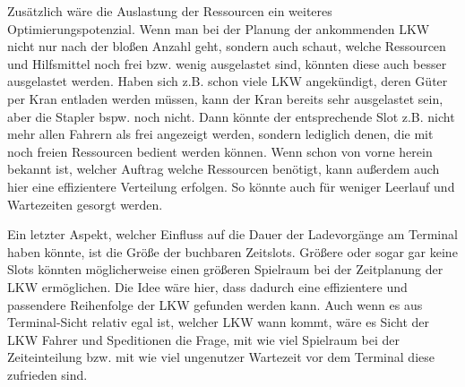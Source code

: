 Zusätzlich wäre die Auslastung der Ressourcen ein weiteres Optimierungspotenzial. Wenn man bei der Planung der ankommenden LKW nicht nur nach der bloßen Anzahl geht, sondern auch schaut, welche Ressourcen und Hilfsmittel noch frei bzw. wenig ausgelastet sind, könnten diese auch besser ausgelastet werden. Haben sich z.B. schon viele LKW angekündigt, deren Güter per Kran entladen werden müssen, kann der Kran bereits sehr ausgelastet sein, aber die Stapler bspw. noch nicht. Dann könnte der entsprechende Slot z.B. nicht mehr allen Fahrern als frei angezeigt werden, sondern lediglich denen, die mit noch freien Ressourcen bedient werden können. Wenn schon von vorne herein bekannt ist, welcher Auftrag welche Ressourcen benötigt, kann außerdem auch hier eine effizientere Verteilung erfolgen. So könnte auch für weniger Leerlauf und Wartezeiten gesorgt werden.

Ein letzter Aspekt, welcher Einfluss auf die Dauer der Ladevorgänge am Terminal haben könnte, ist die Größe der buchbaren Zeitslots. Größere oder sogar gar keine Slots könnten möglicherweise einen größeren Spielraum bei der Zeitplanung der LKW ermöglichen. Die Idee wäre hier, dass dadurch eine effizientere und passendere Reihenfolge der LKW gefunden werden kann. Auch wenn es aus Terminal-Sicht relativ egal ist, welcher LKW wann kommt, wäre es Sicht der LKW Fahrer und Speditionen die Frage, mit wie viel Spielraum bei der Zeiteinteilung bzw. mit wie viel ungenutzer Wartezeit vor dem Terminal diese zufrieden sind. 



